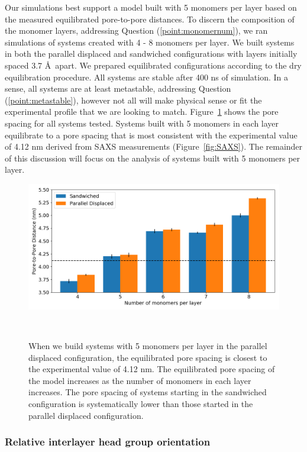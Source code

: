 \documentclass[journal=jpcbfk,manusciprt=article]{achemso}
\begin{document}
  Our simulations best support a model built with 5 monomers per layer based on
  the measured equilibrated pore-to-pore distances. To discern the composition of
  the monomer layers, addressing Question (\ref{point:monomernum}), we ran
  simulations of systems created with 4 - 8 monomers per layer. We built systems
  in both the parallel displaced and sandwiched configurations with layers
  initially spaced 3.7 \AA~apart. We prepared equilibrated configurations
  according to the dry equilibration procedure. All systems are stable after 400
  ns of simulation. In a sense, all systems are at least metastable, addressing
  Question (\ref{point:metastable}), however not all will make physical sense or fit
  the experimental profile that we are looking to match. Figure~\ref{fig:p2p}
  shows the pore spacing for all systems tested. Systems built with 5 monomers in
  each layer equilibrate to a pore spacing that is most consistent with the
  experimental value of 4.12 nm derived from SAXS measurements
  (Figure~\ref{fig:SAXS}). The remainder of this discussion will focus on the
  analysis of systems built with 5 monomers per layer.

  \begin{figure}
	\centering
	\includegraphics[width=\linewidth]{p2p.png}
	\caption{When we build systems with 5 monomers per layer in the
		parallel displaced configuration, the equilibrated pore spacing is closest to
		the experimental value of 4.12 nm. The equilibrated pore spacing of the model
		increases as the number of monomers in each layer increases. The pore spacing
		of systems starting in the sandwiched configuration is systematically 
		lower than those started in the parallel displaced configuration.}~\label{fig:p2p}
  \end{figure}  

  \subsubsection{Relative interlayer head group orientation}
\end{document}
